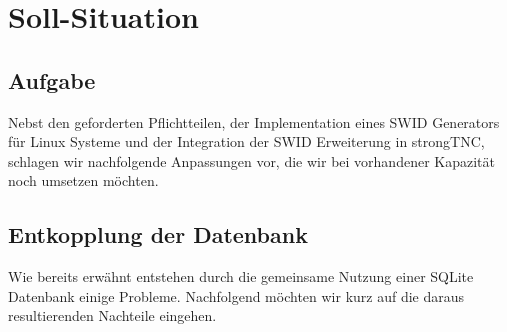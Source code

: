 \section{Soll-Situation}
\label{analyse:soll-situation}

\subsection{Aufgabe}
Nebst den geforderten Pflichtteilen, der Implementation eines SWID Generators
für Linux Systeme und der Integration der SWID Erweiterung in strongTNC,
schlagen wir nachfolgende Anpassungen vor, die wir bei vorhandener Kapazität
noch umsetzen möchten.

\subsection{Entkopplung der Datenbank}
\label{analyse:architekturen}
Wie bereits erwähnt entstehen durch die gemeinsame Nutzung einer SQLite
Datenbank einige Probleme. Nachfolgend möchten wir kurz auf die daraus
resultierenden Nachteile eingehen.

